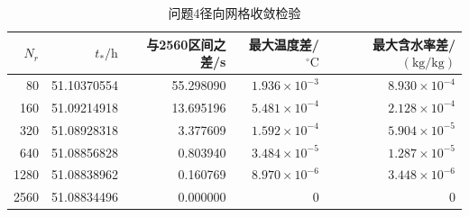 \begin{table}[htbp]
\centering
\caption{问题4径向网格收敛检验}
\label{tab:q4_grid}
\small
\setlength{\tabcolsep}{4pt}        %
\renewcommand{\arraystretch}{0.9} %
\begin{tabular}{@{}rrrrr@{}}
\toprule
$N_r$ &
$t_*/\mathrm{h}$ &
与2560区间之差/s &
最大温度差/$^\circ\mathrm{C}$ &
最大含水率差/$(\mathrm{kg/kg})$ \\
\midrule
80   & 51.10370554 & 55.298090
     & $1.936\times10^{-3}$ & $8.930\times10^{-4}$ \\
160  & 51.09214918 & 13.695196
     & $5.481\times10^{-4}$ & $2.128\times10^{-4}$ \\
320  & 51.08928318 & 3.377609
     & $1.592\times10^{-4}$ & $5.904\times10^{-5}$ \\
640  & 51.08856828 & 0.803940
     & $3.484\times10^{-5}$ & $1.287\times10^{-5}$ \\
1280 & 51.08838962 & 0.160769
     & $8.970\times10^{-6}$ & $3.448\times10^{-6}$ \\
2560 & 51.08834496 & 0.000000
     & $0$ & $0$ \\
\bottomrule
\end{tabular}
\end{table}
